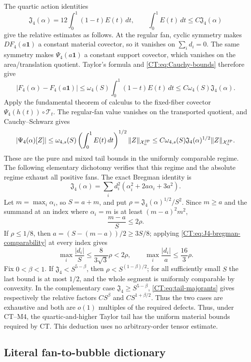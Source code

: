 \documentclass[11pt]{amsart}
\numberwithin{equation}{section}
\theoremstyle{definition}
\theoremstyle{remark}
\newcommand{\Jfour}{\mathfrak J_4}
\newcommand{\Xjp}{\mathcal X^{\rm JP}}
\begin{document}
The quartic action identities
\begin{equation}\label{CT:eq:action}
 \Jfour(\alpha)=12\int_0^1(1-t)E(t)\,dt,
 \qquad
 \int_0^1E(t)\,dt\le C\Jfour(\alpha)
\end{equation}
give the relative estimates as follows.  At the regular fan, cyclic
symmetry makes $DF_4(a\mathbf1)$ a constant material covector, so it
vanishes on $\sum_i d_i=0$.  The same symmetry makes
$\Psi_4(a\mathbf1)$ a constant support covector, which vanishes on the
area/translation quotient.  Taylor's formula and \eqref{CT:eq:Cauchy-bounds}
therefore give
\[
 |F_4(\alpha)-F_4(a\mathbf1)|
 \le \omega_4(S)\int_0^1(1-t)E(t)\,dt
 \le C\omega_4(S)\Jfour(\alpha).
\]
Apply the fundamental theorem of calculus to the fixed-fiber covector
$\Psi_4(h(t))\circ\mathcal T_t$.  The regular-fan value vanishes on the
transported quotient, and Cauchy--Schwarz gives
\[
 |\Psi_4(\alpha)[Z]|
 \le \omega_{4,s}(S)\left(\int_0^1E(t)\,dt\right)^{1/2}
       \|Z\|_{\Xjp_\alpha}
 \le C\omega_{4,s}(S)\Jfour(\alpha)^{1/2}\|Z\|_{\Xjp_\alpha}.
\]
These are the pure and mixed tail bounds in the uniformly comparable
regime.  The following elementary dichotomy verifies that this regime and
the absolute regime exhaust all positive fans.  The exact Bregman identity
is
\begin{equation}\label{CT:eq:J4-bregman-comparability}
 \Jfour(\alpha)=\sum_i d_i^2
  (\alpha_i^2+2a\alpha_i+3a^2).
\end{equation}
Let $m=\max_i\alpha_i$, so $S=a+m$, and put
$\rho=\Jfour(\alpha)^{1/2}/S^2$.  Since $m\ge a$ and the summand at an
index where $\alpha_i=m$ is at least $(m-a)^2m^2$,
\[
 \frac{m-a}{S}\le2\rho.
\]
If $\rho\le1/8$, then $a=(S-(m-a))/2\ge3S/8$; applying
\eqref{CT:eq:J4-bregman-comparability} at every index gives
\[
 \max_i\frac{|d_i|}{S}
 \le\frac{8}{3\sqrt3}\rho<2\rho,
 \qquad
 \max_i\frac{|d_i|}{a}\le\frac{16}{3}\rho.
\]
Fix $0<\beta<1$.  If $\Jfour<S^{5-\beta}$, then
$\rho<S^{(1-\beta)/2}$; for all sufficiently small $S$ the last bound is
at most $1/2$, and the whole segment is uniformly comparable by convexity.
In the complementary case $\Jfour\ge S^{5-\beta}$,
\eqref{CT:eq:tail-majorants} gives respectively the relative factors
$CS^\beta$ and $CS^{1+\beta/2}$.  Thus the two cases are exhaustive and
both are $o(1)$ multiples of the required defects.
Thus, under CT--M4, the quartic-and-higher Taylor tail has the uniform
material bounds required by CT.  This deduction uses no arbitrary-order
tensor estimate.

\subsection{Literal fan-to-bubble dictionary}
\end{document}
